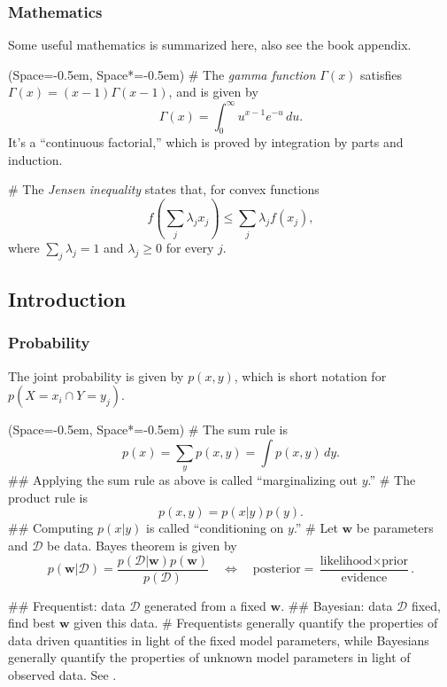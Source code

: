\documentclass[12pt, a4paper]{article}
\newcommand{\listSpace}{-0.5em}%
\newcommand{\D}{\mathcal{D}}
\newcommand{\vect}[1]{\bm{#1}}
\begin{document}
\subsubsection*{Mathematics}
Some useful mathematics is summarized here, also see the book appendix.
\begin{easylist}[itemize]
	\ListProperties(Space=\listSpace, Space*=\listSpace)
	# The \emph{gamma function} $\Gamma(x)$ satisfies $\Gamma(x) = (x-1) \Gamma(x-1)$, and is given by
	\begin{equation*}
	\Gamma(x) = \int_{0}^{\infty} u^{x-1} e^{-u}  \, du.
	\end{equation*}
	It's a ``continuous factorial,'' which is proved by integration by parts and induction.
	
	# The \emph{Jensen inequality} states that, for convex functions
	\begin{equation*}
	f\left( \sum_j \lambda_j x_j\right) \leq \sum_j \lambda_j f(x_j),
	\end{equation*}
	where $\sum_j \lambda_j = 1$ and $\lambda_j \geq 0$ for every $j$.
\end{easylist}

\subsection{Introduction}


\subsubsection*{Probability}
The joint probability is given by $p(x, y)$, which is short notation for $p(X = x_i \cap Y = y_j)$.
\begin{easylist}[itemize]
	\ListProperties(Space=\listSpace, Space*=\listSpace)
	# The sum rule is 
	\begin{equation*}
	p(x) = \sum_y p(x, y) = \int p(x, y) \, dy.
	\end{equation*}
	## Applying the sum rule as above is called ``marginalizing out $y$.''
	# The product rule is 
	\begin{equation*}
	p(x, y) = p(x | y) p(y).
	\end{equation*}
	## Computing $p(x | y)$ is called ``conditioning on $y$.''
	# Let $\vect{w}$ be parameters and $\D$ be data.
	Bayes theorem is given by
	\begin{equation*}
	p(\vect{w} | \D) = \frac{p(\D | \vect{w}) p(\vect{w})}{p(\D)} \quad \Leftrightarrow \quad
	\text{posterior} = \frac{\text{likelihood} \times \text{prior}}{\text{evidence}}.
	\end{equation*}
	
	## Frequentist: data $\D$ generated from a fixed $\vect{w}$.
	## Bayesian: data $\D$ fixed, find best $\vect{w}$ given this data.
	# Frequentists generally quantify the properties of data driven
	quantities in light of the fixed model parameters,
	while Bayesians generally quantify the properties of unknown
	model parameters in light of observed data.
	See \cite{vanderplas_frequentism_2014}.
\end{easylist}
\end{document}
